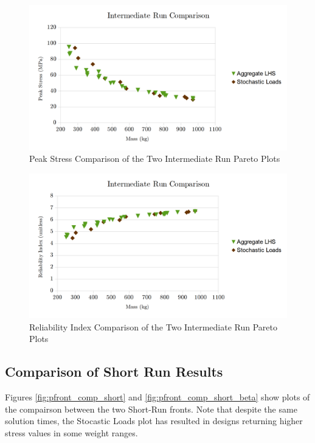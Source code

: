 \begin{figure}[!htb]
\includegraphics[width=\textwidth]{img/pf_comp_int.png}
\caption{Peak Stress Comparison of the Two Intermediate Run Pareto Plots}
\label{fig:pfront_comp_int}
\end{figure}
\begin{figure}[!htb]
\includegraphics[width=\textwidth]{img/pf_comp_int_beta.png}
\caption{Reliability Index Comparison of the Two Intermediate Run Pareto Plots}
\label{fig:pfront_comp_int_beta}
\end{figure}

\subsection{Comparison of Short Run Results}
Figures \ref{fig:pfront_comp_short} and \ref{fig:pfront_comp_short_beta} show plots of the compairson between the two Short-Run fronts. Note that despite the same solution times, the Stocastic Loads plot has resulted in designs returning higher stress values in some weight ranges. 

